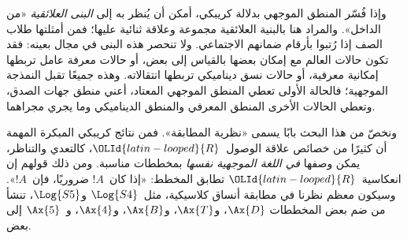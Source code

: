 \documentclass[../../../include/open-logic-section]{subfiles}
\begin{document}
وإذا فُسّر المنطق الموجهي بدلالة كريبكي، أمكن أن يُنظر به إلى
\emph{البنى العلائقية} «من الداخل». والمراد هنا بالبنية العلائقية
مجموعة وعلاقة ثنائية عليها؛ فمن أمثلتها طلاب الصف إذا رُتبوا بأرقام
ضمانهم الاجتماعي. ولا تنحصر هذه البنى في مجال بعينه: فقد تكون حالات
العالم مع إمكان بعضها بالقياس إلى بعض، أو حالات معرفة عامل تربطها
إمكانية معرفية، أو حالات نسق ديناميكي تربطها انتقالاته. وهذه جميعًا
تقبل النمذجة الموجهية؛ فالحالة الأولى تعطي المنطق الموجهي المعتاد،
أعني منطق جهات الصدق، وتعطي الحالات الأخرى المنطق المعرفي والمنطق
الديناميكي وما يجري مجراهما.

ونخصّ من هذا البحث بابًا يسمى «نظرية المطابقة». فمن نتائج كريبكي
المبكرة المهمة أن كثيرًا من خصائص علاقة الوصول~$\OLId{latin-looped}{R}$، كالتعدي
والتناظر، يمكن وصفها \emph{في اللغة الموجهية نفسها} بمخططات مناسبة.
ومن ذلك قولهم إن انعكاسية~$\OLId{latin-looped}{R}$ تطابق المخطط: «إذا كان~$!A$
ضروريًا، فإن~$!A$». وسيكون معظم نظرنا في مطابقة أنساق كلاسيكية،
مثل~$\Log{S4}$ و$\Log{S5}$، تنشأ من ضم بعض المخططات
$\Ax{D}$، و$\Ax{T}$، و$\Ax{B}$، و$\Ax{4}$، و~$\Ax{5}$ إلى بعض.
\end{document}
